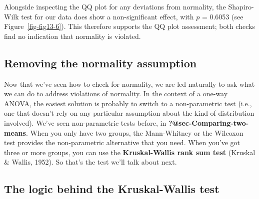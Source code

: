 \documentclass[
  a4paper,
]{book}
\begin{document}
Alongside inspecting the QQ plot for any deviations from normality, the
Shapiro-Wilk test for our data does show a non-significant effect, with
\(p\) = 0.6053 (see Figure~\ref{fig-fig13-6}). This therefore supports
the QQ plot assessment; both checks find no indication that normality is
violated.

\hypertarget{removing-the-normality-assumption}{%
\subsection{Removing the normality
assumption}\label{removing-the-normality-assumption}}

Now that we've seen how to check for normality, we are led naturally to
ask what we can do to address violations of normality. In the context of
a one-way ANOVA, the easiest solution is probably to switch to a
non-parametric test (i.e., one that doesn't rely on any particular
assumption about the kind of distribution involved). We've seen
non-parametric tests before, in \textbf{?@sec-Comparing-two-means}. When
you only have two groups, the Mann-Whitney or the Wilcoxon test provides
the non-parametric alternative that you need. When you've got three or
more groups, you can use the \textbf{Kruskal-Wallis rank sum test}
(Kruskal \& Wallis, 1952). So that's the test we'll talk about next.

\hypertarget{the-logic-behind-the-kruskal-wallis-test}{%
\subsection{The logic behind the Kruskal-Wallis
test}\label{the-logic-behind-the-kruskal-wallis-test}}
\end{document}
